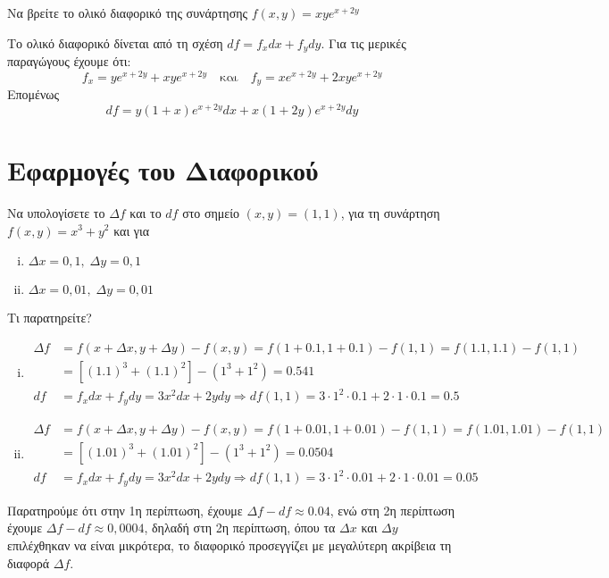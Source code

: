 \begin{example}
  Να βρείτε το ολικό διαφορικό της συνάρτησης $ f(x,y) = xye^{x+2y} $ 
  \begin{solution}
  \item {}
    Το ολικό διαφορικό δίνεται από τη σχέση $ df = f_{x} dx + f_{y} dy $.  
    Για τις μερικές παραγώγους έχουμε ότι: 
    \[
      f_{x} = ye^{x+2y}+xye^{x+2y} \quad \text{και} \quad f_{y} = xe^{x+2y} +
      2xye^{x+2y}
    \] 
    Επομένως
    \[
      df = y(1+x)e^{x+2y} dx + x(1+2y)e^{x+2y}dy
    \]
  \end{solution}
\end{example}

\section{Εφαρμογές του Διαφορικού}

\begin{example}
  Να υπολογίσετε το $ \Delta f $ και το $ df $ στο σημείο $ (x,y) = (1,1) $, 
  για τη συνάρτηση $ f(x,y) = x^{3}+y^{2} $ και για 
  \begin{enumerate}[i)]
    \item $ \Delta x = 0,1, \; \Delta y = 0,1 $
    \item $ \Delta x = 0,01, \; \Delta y = 0,01 $
  \end{enumerate}
  Τι παρατηρείτε?
\end{example}
\begin{solution}
\item {}
  \begin{enumerate}[i)]
    \item 
      \begin{align*} 
        \Delta f &= f(x+ \Delta x, y + \Delta y) - f(x,y) = f(1+0.1,1+0.1) - 
        f(1,1) = f(1.1,1.1) - f(1,1) \\ 
                 &= [(1.1)^{3}+(1.1)^{2}] - (1^{3}+1^{2}) = 0.541 \\
        df &= f_{x}dx + f_{y}dy  = 3x^{2} dx + 2y dy \Rightarrow df (1,1) = 
        3\cdot 1^{2} \cdot 0.1 + 2 \cdot 1 \cdot 0.1 = 0.5 
      \end{align*}
    \item 
      \begin{align*} 
        \Delta f &= f(x+ \Delta x, y + \Delta y) - f(x,y) = f(1+0.01,1+0.01) - 
        f(1,1) = f(1.01,1.01) - f(1,1) \\ 
                 &= [(1.01)^{3}+(1.01)^{2}] - (1^{3}+1^{2}) = 0.0504 \\
        df &= f_{x}dx + f_{y}dy  = 3x^{2} dx + 2y dy \Rightarrow df (1,1) = 
        3\cdot 1^{2} \cdot 0.01 + 2 \cdot 1 \cdot 0.01 = 0.05 
      \end{align*}
  \end{enumerate}
  Παρατηρούμε ότι στην 1η περίπτωση, έχουμε
  $ \Delta f - df \approx 0.04 $, ενώ στη 2η περίπτωση έχουμε $ \Delta f - df \approx 
  0,0004 $, δηλαδή στη 2η περίπτωση, όπου τα $ \Delta x $ και $ \Delta y $ επιλέχθηκαν 
  να είναι μικρότερα, το διαφορικό προσεγγίζει με μεγαλύτερη ακρίβεια τη διαφορά 
  $ \Delta f $.
\end{solution}

